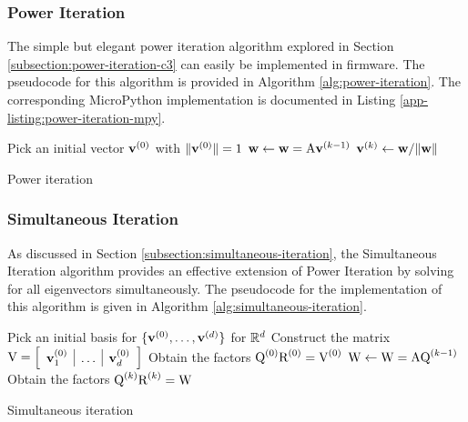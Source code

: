 \subsubsection{Power Iteration}
The simple but elegant power iteration algorithm explored in Section \ref{subsection:power-iteration-c3} can easily be implemented in firmware. The pseudocode for this algorithm is provided in Algorithm \ref{alg:power-iteration}. The corresponding MicroPython implementation is documented in Listing \ref{app-listing:power-iteration-mpy}.
\begin{algorithm}
\begin{algorithmic}
\State Pick an initial vector ${\mathbf{v}}^{(0)}$ with $\|{\mathbf{v}}^{(0)}\|=1$ 
 
    \State ${\mathbf{w}} \gets {\mathbf{w}} = {\textrm{A}}{\mathbf{v}}^{(k-1)}$ 
    \State ${\mathbf{v}}^{(k)} \gets {\mathbf{w}} / \| {\mathbf{w}}\|$ 
\EndFor
\end{algorithmic}
\caption{Power iteration}
\label{alg:power-iteration}
\end{algorithm}

\subsubsection{Simultaneous Iteration}
As discussed in Section \ref{subsection:simultaneous-iteration}, the Simultaneous Iteration algorithm provides an effective extension of Power Iteration by solving for all eigenvectors simultaneously. The pseudocode for the implementation of this algorithm is given in Algorithm \ref{alg:simultaneous-iteration}.
\begin{algorithm}
\begin{algorithmic}
\State Pick an initial basis for $\{{\mathbf{v}}^{(0)}, \dots, {\mathbf{v}}^{(d)} \}$ for $\mathbb{R}^d$
\State Construct the matrix ${\textrm{V}} = \left[\begin{array}{l|l|l}{\mathbf{v}}_1^{(0)} & \dots & {\mathbf{v}}_d^{(0)}\end{array}\right]$
\State Obtain the factors ${\textrm{Q}}^{(0)}{\textrm{R}}^{(0)} = {\textrm{V}}^{(0)}$ 
{}
    \State ${\textrm{W}} \gets {\textrm{W}} = {\textrm{A}}{\textrm{Q}}^{(k-1)}$
    \State Obtain the factors ${\textrm{Q}}^{(k)}{\textrm{R}}^{(k)} = {\textrm{W}}$ 
\EndFor
\end{algorithmic}
\caption{Simultaneous iteration}
\label{alg:simultaneous-iteration}
\end{algorithm}

